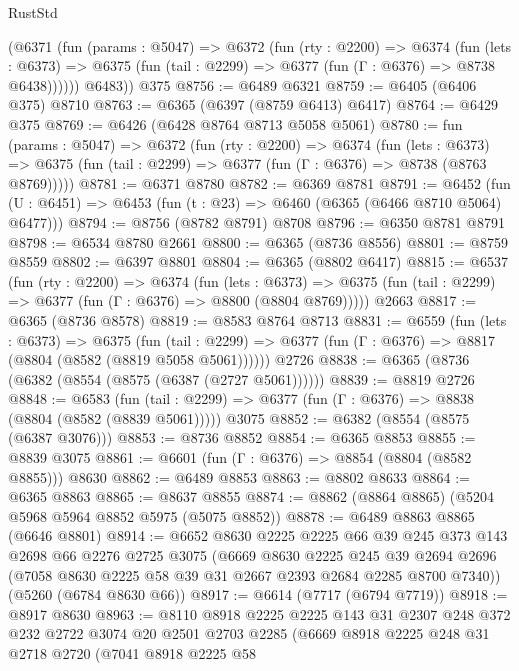 \begin{lexlean}{RustStd}
\begin{coremodule}
        (@6371
          (fun (params : @5047) =>
          @6372
            (fun (rty : @2200) =>
            @6374
              (fun (lets : @6373) =>
              @6375 (fun (tail : @2299) => @6377 (fun (Γ : @6376) => @8738 @6438))))))
        @6483))
    @375
@8756 := @6489 @6321
@8759 := @6405 (@6406 @375) @8710
@8763 := @6365 (@6397 (@8759 @6413) @6417)
@8764 := @6429 @375
@8769 := @6426 (@6428 @8764 @8713 @5058 @5061)
@8780 := fun (params : @5047) =>
  @6372
    (fun (rty : @2200) =>
    @6374
      (fun (lets : @6373) =>
      @6375 (fun (tail : @2299) => @6377 (fun (Γ : @6376) => @8738 (@8763 @8769)))))
@8781 := @6371 @8780
@8782 := @6369 @8781
@8791 := @6452 (fun (U : @6451) => @6453 (fun (t : @23) => @6460 (@6365 (@6466 @8710 @5064) @6477)))
@8794 := @8756 (@8782 @8791) @8708
@8796 := @6350 @8781 @8791
@8798 := @6534 @8780 @2661
@8800 := @6365 (@8736 @8556)
@8801 := @8759 @8559
@8802 := @6397 @8801
@8804 := @6365 (@8802 @6417)
@8815 := @6537
    (fun (rty : @2200) =>
    @6374
      (fun (lets : @6373) =>
      @6375 (fun (tail : @2299) => @6377 (fun (Γ : @6376) => @8800 (@8804 @8769)))))
    @2663
@8817 := @6365 (@8736 @8578)
@8819 := @8583 @8764 @8713
@8831 := @6559
    (fun (lets : @6373) =>
    @6375
      (fun (tail : @2299) => @6377 (fun (Γ : @6376) => @8817 (@8804 (@8582 (@8819 @5058 @5061))))))
    @2726
@8838 := @6365 (@8736 (@6382 (@8554 (@8575 (@6387 (@2727 @5061))))))
@8839 := @8819 @2726
@8848 := @6583
    (fun (tail : @2299) => @6377 (fun (Γ : @6376) => @8838 (@8804 (@8582 (@8839 @5061)))))
    @3075
@8852 := @6382 (@8554 (@8575 (@6387 @3076)))
@8853 := @8736 @8852
@8854 := @6365 @8853
@8855 := @8839 @3075
@8861 := @6601 (fun (Γ : @6376) => @8854 (@8804 (@8582 @8855))) @8630
@8862 := @6489 @8853
@8863 := @8802 @8633
@8864 := @6365 @8863
@8865 := @8637 @8855
@8874 := @8862 (@8864 @8865) (@5204 @5968 @5964 @8852 @5975 (@5075 @8852))
@8878 := @6489 @8863 @8865 (@6646 @8801)
@8914 := @6652
    @8630
    @2225
    @2225
    @66
    @39
    @245
    @373
    @143
    @2698
    @66
    @2276
    @2725
    @3075
    (@6669
      @8630
      @2225
      @245
      @39
      @2694
      @2696
      (@7058 @8630 @2225 @58 @39 @31 @2667 @2393 @2684 @2285 @8700 @7340))
    (@5260 (@6784 @8630 @66))
@8917 := @6614 (@7717 (@6794 @7719))
@8918 := @8917 @8630
@8963 := @8110
    @8918
    @2225
    @2225
    @143
    @31
    @2307
    @248
    @372
    @232
    @2722
    @3074
    @20
    @2501
    @2703
    @2285
    (@6669
      @8918
      @2225
      @248
      @31
      @2718
      @2720
      (@7041
        @8918
        @2225
        @58

\end{coremodule}
\end{lexlean}
